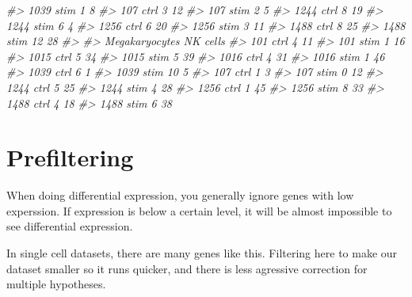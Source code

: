 \documentclass[
]{book}
\newenvironment{Shaded}{\begin{snugshade}}{\end{snugshade}}
\newcommand{\CommentTok}[1]{\textcolor[rgb]{0.56,0.35,0.01}{\textit{#1}}}
\begin{document}
\begin{Shaded}
\begin{Highlighting}[]
\CommentTok{\#\textgreater{}   1039 stim               1                 8}
\CommentTok{\#\textgreater{}   107 ctrl                3                12}
\CommentTok{\#\textgreater{}   107 stim                2                 5}
\CommentTok{\#\textgreater{}   1244 ctrl               8                19}
\CommentTok{\#\textgreater{}   1244 stim               6                 4}
\CommentTok{\#\textgreater{}   1256 ctrl               6                20}
\CommentTok{\#\textgreater{}   1256 stim               3                11}
\CommentTok{\#\textgreater{}   1488 ctrl               8                25}
\CommentTok{\#\textgreater{}   1488 stim              12                28}
\CommentTok{\#\textgreater{}            }
\CommentTok{\#\textgreater{}             Megakaryocytes NK cells}
\CommentTok{\#\textgreater{}   101 ctrl               4       11}
\CommentTok{\#\textgreater{}   101 stim               1       16}
\CommentTok{\#\textgreater{}   1015 ctrl              5       34}
\CommentTok{\#\textgreater{}   1015 stim              5       39}
\CommentTok{\#\textgreater{}   1016 ctrl              4       31}
\CommentTok{\#\textgreater{}   1016 stim              1       46}
\CommentTok{\#\textgreater{}   1039 ctrl              6        1}
\CommentTok{\#\textgreater{}   1039 stim             10        5}
\CommentTok{\#\textgreater{}   107 ctrl               1        3}
\CommentTok{\#\textgreater{}   107 stim               0       12}
\CommentTok{\#\textgreater{}   1244 ctrl              5       25}
\CommentTok{\#\textgreater{}   1244 stim              4       28}
\CommentTok{\#\textgreater{}   1256 ctrl              1       45}
\CommentTok{\#\textgreater{}   1256 stim              8       33}
\CommentTok{\#\textgreater{}   1488 ctrl              4       18}
\CommentTok{\#\textgreater{}   1488 stim              6       38}
\end{Highlighting}
\end{Shaded}

\hypertarget{prefiltering}{%
\section{Prefiltering}\label{prefiltering}}

When doing differential expression, you generally ignore genes with low experssion.
If expression is below a certain level, it will be almost impossible to see differential expression.

In single cell datasets, there are many genes like this. Filtering here to make our dataset smaller so it runs quicker, and there is less agressive correction for multiple hypotheses.
\end{document}

